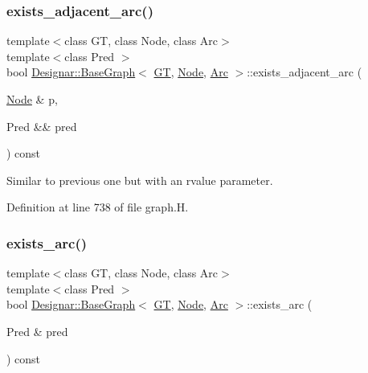 \subsubsection{\texorpdfstring{exists\+\_\+adjacent\+\_\+arc()}{exists\_adjacent\_arc()}\hspace{0.1cm}{\footnotesize\ttfamily [2/2]}}
{\footnotesize\ttfamily template$<$class GT, class Node, class Arc$>$ \\
template$<$class Pred $>$ \\
bool \hyperlink{class_designar_1_1_base_graph}{Designar\+::\+Base\+Graph}$<$ \hyperlink{demo-buildgraph_8_c_a3001c40d2c31ca87ed96cd7d1334a55e}{GT}, \hyperlink{namespace_designar_a5af326c65aa2bd26b26c410f2030d09e}{Node}, \hyperlink{namespace_designar_a3f55fb5513d62ff47cbc8f72b8e95d6f}{Arc} $>$\+::exists\+\_\+adjacent\+\_\+arc (\begin{DoxyParamCaption}\item[{\hyperlink{namespace_designar_a5af326c65aa2bd26b26c410f2030d09e}{Node} \&}]{p,  }\item[{Pred \&\&}]{pred }\end{DoxyParamCaption}) const\hspace{0.3cm}{\ttfamily [inline]}}



Similar to previous one but with an rvalue parameter. 



Definition at line 738 of file graph.\+H.

\mbox{\label{class_designar_1_1_base_graph_aaed186c42ed6b51f761cda959ecde601}} 
\subsubsection{\texorpdfstring{exists\+\_\+arc()}{exists\_arc()}\hspace{0.1cm}{\footnotesize\ttfamily [1/2]}}
{\footnotesize\ttfamily template$<$class GT, class Node, class Arc$>$ \\
template$<$class Pred $>$ \\
bool \hyperlink{class_designar_1_1_base_graph}{Designar\+::\+Base\+Graph}$<$ \hyperlink{demo-buildgraph_8_c_a3001c40d2c31ca87ed96cd7d1334a55e}{GT}, \hyperlink{namespace_designar_a5af326c65aa2bd26b26c410f2030d09e}{Node}, \hyperlink{namespace_designar_a3f55fb5513d62ff47cbc8f72b8e95d6f}{Arc} $>$\+::exists\+\_\+arc (\begin{DoxyParamCaption}\item[{Pred \&}]{pred }\end{DoxyParamCaption}) const\hspace{0.3cm}{\ttfamily [inline]}}



